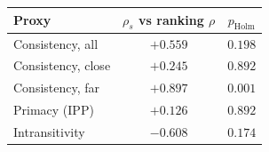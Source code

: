 \begin{tabular}{lcc}
  \toprule
  Proxy & $\rho_s$ vs ranking $\rho$ & $p_{\text{Holm}}$ \\
  \midrule
  Consistency, all             & $+0.559$ & $0.198$ \\
  Consistency, close           & $+0.245$ & $0.892$ \\
  Consistency, far             & $+0.897$ & $0.001$ \\
  Primacy (IPP)                & $+0.126$ & $0.892$ \\
  Intransitivity               & $-0.608$ & $0.174$ \\
  \bottomrule
\end{tabular}
